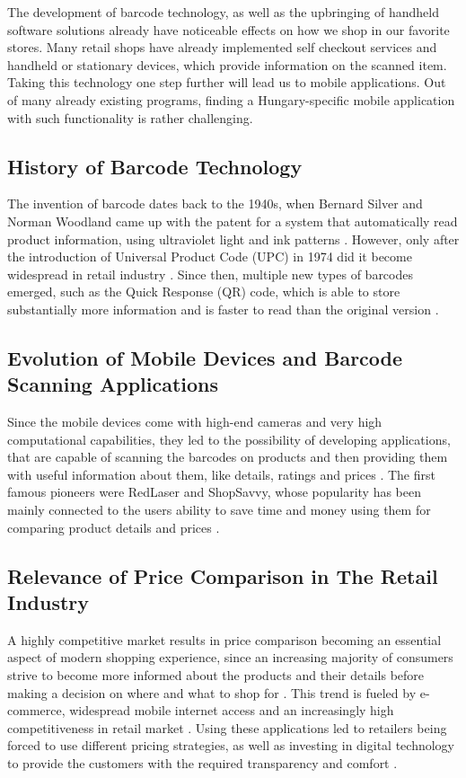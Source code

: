 The development of barcode technology, as well as the upbringing of handheld software solutions already have noticeable effects on how we shop in our favorite stores. Many retail shops have already implemented self checkout services and handheld or stationary devices, which provide information on the scanned item. Taking this technology one step further will lead us to mobile applications. Out of many already existing programs, finding a Hungary-specific mobile application with such functionality is rather challenging.

\subsection{History of Barcode Technology}
The invention of barcode dates back to the 1940s, when Bernard Silver and Norman Woodland came up with the patent for a system that automatically read product information, using ultraviolet light and ink patterns \cite{barcode2023}. However, only after the introduction of Universal Product Code (UPC) in 1974 did it become widespread in retail industry \cite{weightman2015}. Since then, multiple new types of barcodes emerged, such as the Quick Response (QR) code, which is able to store substantially more information and is faster to read than the original version \cite{densowave2011}. 

\subsection{Evolution of Mobile Devices and Barcode Scanning Applications}

Since the mobile devices come with high-end cameras and very high computational capabilities, they led to the possibility of developing applications, that are capable of scanning the barcodes on products and then providing them with useful information about them, like details, ratings and prices \cite{chen2012}. The first famous pioneers were RedLaser and ShopSavvy, whose popularity has been mainly connected to the users ability to save time and money using them for comparing product details and prices \cite{rao2011}.

\subsection{Relevance of Price Comparison in The Retail Industry}

A highly competitive market results in price comparison becoming an essential aspect of modern shopping experience, since an increasing majority of consumers strive to become more informed about the products and their details before making a decision on where and what to shop for \cite{huang2006}. This trend is fueled by e-commerce, widespread mobile internet access and an increasingly high competitiveness in retail market \cite{pentina2014}. Using these applications led to retailers being forced to use different pricing strategies, as well as investing in digital technology to provide the customers with the required transparency and comfort \cite{grewal2011}.